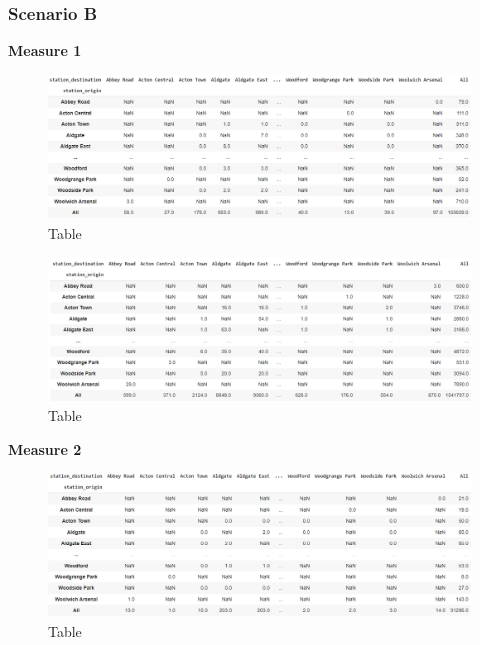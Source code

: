 \documentclass[10pt]{report}
\numberwithin{figure}{section}
\numberwithin{table}{section}
\begin{document}
\newpage    

\subsubsection{Scenario B}

\textbf{Measure 1}
    \begin{figure}[htp]
        \centering
        \includegraphics[width=16cm]{Image/Part2_OD5_scenario B.png}
        \caption{Table}
        \label{fig:galaxy}
    \end{figure}

    \begin{figure}[htp]
        \centering
        \includegraphics[width=16cm]{Image/Part2_OD6_scenario B.png}
        \caption{Table}
        \label{fig:galaxy}
    \end{figure}

\textbf{Measure 2}    
    \begin{figure}[htp]
        \centering
        \includegraphics[width=16cm]{Image/Part2_OD7_scenario B.png}
        \caption{Table}
        \label{fig:galaxy}
    \end{figure}
\end{document}
